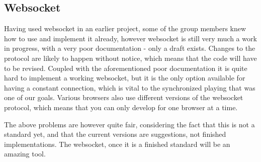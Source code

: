 \subsection{Websocket}
Having used websocket in an earlier project, some of the group members knew how to use and implement it already, however
websocket is still very much a work in progress, with a very poor documentation - only a draft exists. Changes to the protocol
are likely to happen without notice, which means that the code will have to be revised. Coupled with the aforementioned poor
documentation it is quite hard to implement a working websocket, but it is the only option available for having a constant
connection, which is vital to the synchronized playing that was one of our goals. Various browsers also use different versions
of the websocket protocol, which means that you can only develop for one browser at a time. 

The above problems are however quite fair, considering the fact that this is not a standard yet, and that the current versions are suggestions, not finished implementations. The websocket, once it is a finished standard will be an amazing tool.